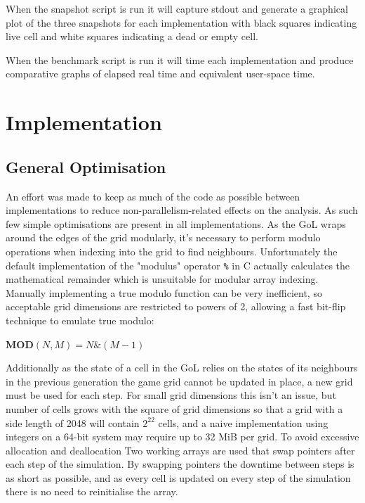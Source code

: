 \documentclass[]{article}
\begin{document}
When the snapshot script is run it will capture stdout and generate a graphical plot of the three snapshots for each implementation with black squares indicating live cell and white squares indicating a dead or empty cell.

When the benchmark script is run it will time each implementation and produce comparative graphs of elapsed real time and equivalent user-space time.

\section{Implementation}
\subsection{General Optimisation}
An effort was made to keep as much of the code as possible between implementations to reduce non-parallelism-related effects on the analysis. As such few simple optimisations are present in all implementations. As the GoL wraps around the edges of the grid modularly, it's necessary to perform modulo operations when indexing into the grid to find neighbours. Unfortunately the default implementation of the "modulus" operator \texttt{\%} in C actually calculates the mathematical remainder which is unsuitable for modular array indexing. Manually implementing a true modulo function can be very inefficient, so acceptable grid dimensions are restricted to powers of 2, allowing a fast bit-flip technique to emulate true modulo:
\begin{quoting}
$\textbf{MOD}(N, M) = N \mathrel{\&}  (M - 1)$
\end{quoting}

Additionally as the state of a cell in the GoL relies on the states of its neighbours in the previous generation the game grid cannot be updated in place, a new grid must be used for each step. For small grid dimensions this isn't an issue, but number of cells grows with the square of grid dimensions so that a grid with a side length of 2048 will contain $2^{22}$ cells, and a naive implementation using integers on a 64-bit system may require up to 32 MiB per grid. To avoid excessive allocation and deallocation Two working arrays are used that swap pointers after each step of the simulation. By swapping pointers the downtime between steps is as short as possible, and as every cell is updated on every step of the simulation there is no need to reinitialise the array.
\end{document}
